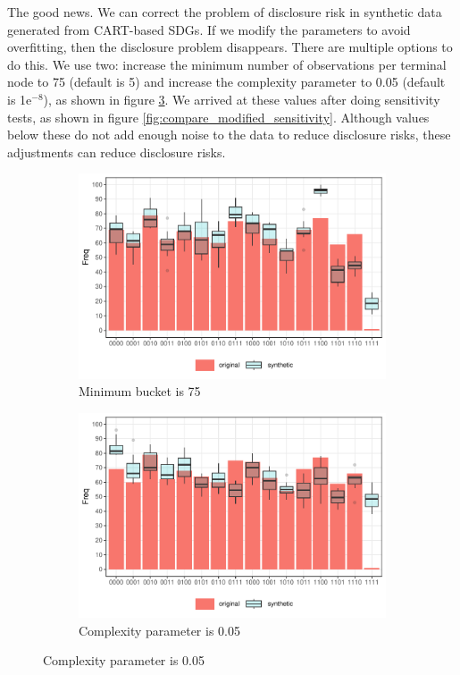 \documentclass[runningheads]{llncs}
\begin{document}
The good news.  We can correct the problem of disclosure risk in synthetic data generated from CART-based SDGs.  If we modify the parameters to avoid overfitting, then the disclosure problem disappears.  There are multiple options to do this.  We use two: increase the minimum number of observations per terminal node to 75 (default is 5) and increase the complexity parameter to 0.05 (default is 1e$^{-8}$), as shown in figure \ref{fig:compare_modified}.  We arrived at these values after doing sensitivity tests, as shown in figure \ref{fig:compare_modified_sensitivity}.  Although values below these do not add enough noise to the data to reduce disclosure risks, these adjustments can reduce disclosure risks.

\begin{figure}[!h]
    \centering
    \caption{Compare original and synthetic data}
    \begin{subfigure}{0.48\textwidth}
        \includegraphics[width=\textwidth]{../graphs/graph_cart_modified_mb_histogram_compare_10.pdf}
        \caption{Minimum bucket is 75}
        \label{fig:attacker_modified_mb}
    \end{subfigure}
    \hfill
    \begin{subfigure}{0.48\textwidth}
        \includegraphics[width=\textwidth]{../graphs/graph_cart_modified_cp_histogram_compare_10.pdf}
        \caption{Complexity parameter is 0.05}
        \label{fig:attacker_modified_cp}
    \end{subfigure}
    \label{fig:compare_modified}
\end{figure}
\end{document}

